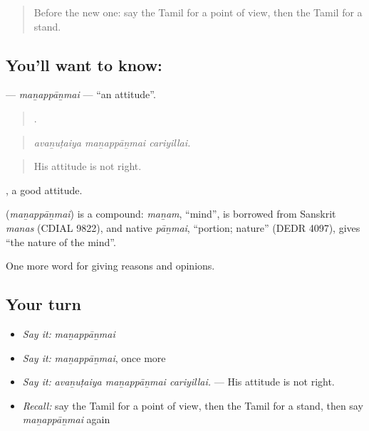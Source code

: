 \label{lesson:TA-C350-manappanmai}



\begin{quote}
Before the new one: say the Tamil for a point of view, then the Tamil for a stand.
\end{quote}

\subsection*{You'll want to know: }
\textbf{} — \emph{maṉappāṉmai} — \textquotedblleft{}an attitude\textquotedblright{}.

\begin{quote}
  .
\end{quote}

\begin{quote}
\emph{avaṉuṭaiya maṉappāṉmai cariyillai.}
\end{quote}

\begin{quote}
His attitude is not right.
\end{quote}

 , a good attitude.

\begin{cousinweb}
\textbf{} (\emph{maṉappāṉmai}) is a compound: \emph{maṉam}, \textquotedblleft{}mind\textquotedblright{}, is borrowed from Sanskrit \emph{manas} (CDIAL 9822), and native \emph{pāṉmai}, \textquotedblleft{}portion; nature\textquotedblright{} (DEDR 4097), gives \textquotedblleft{}the nature of the mind\textquotedblright{}.
\end{cousinweb}

\begin{grammarlens}[title={What you've built}]
One more word for giving reasons and opinions.
\end{grammarlens}

\subsection*{Your turn}
\begin{itemize}
\raggedright
  \item \emph{Say it:} \emph{maṉappāṉmai}
  \item \emph{Say it:} \emph{maṉappāṉmai}, once more
  \item \emph{Say it:} \emph{avaṉuṭaiya maṉappāṉmai cariyillai.} — His attitude is not right.
  \item \emph{Recall:} say the Tamil for a point of view, then the Tamil for a stand, then say \emph{maṉappāṉmai} again
\end{itemize}

